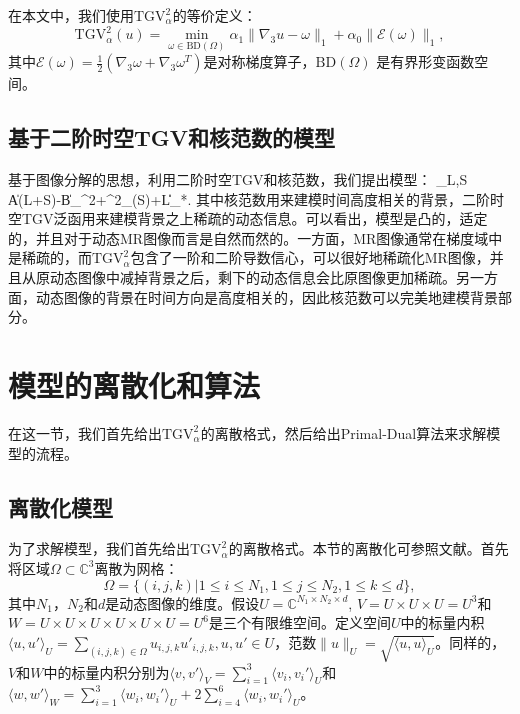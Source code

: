 在本文中，我们使用$\mathrm{TGV}_{\alpha}^2$的等价定义：
$$\mathrm{TGV}_\alpha^2(u)=\min_{\omega\in \mathrm{BD}(\Omega)}\alpha_1\|\nabla_3 u-\omega\|_1 + \alpha_0\|\mathcal{E}(\omega)\|_1,$$
其中$\mathcal{E}(\omega)=\frac{1}{2}(\nabla_3\omega+\nabla_3\omega^{T})$是对称梯度算子，$\mathrm{BD}(\Omega)$ 是有界形变函数空间。

\subsection{基于二阶时空TGV和核范数的模型}
基于图像分解的思想，利用二阶时空TGV和核范数，我们提出模型：
\beq
\min_{L,S} \|A(L+S)-B\|_{}^2+^2_\alpha(S)+\beta\|L\|_*.
\label{equ:proposed}
\eeq
其中核范数用来建模时间高度相关的背景，二阶时空TGV泛函用来建模背景之上稀疏的动态信息。可以看出，模型是凸的，适定的，并且对于动态MR图像而言是自然而然的。一方面，MR图像通常在梯度域中是稀疏的，而$\mathrm{TGV}_{\alpha}^2$包含了一阶和二阶导数信心，可以很好地稀疏化MR图像，并且从原动态图像中减掉背景之后，剩下的动态信息会比原图像更加稀疏。另一方面，动态图像的背景在时间方向是高度相关的，因此核范数可以完美地建模背景部分。

\section{模型的离散化和算法}
在这一节，我们首先给出$\mathrm{TGV}_{\alpha}^2$的离散格式，然后给出Primal-Dual算法来求解模型的流程。

\subsection{离散化模型}
为了求解模型，我们首先给出$\mathrm{TGV}_{\alpha}^2$的离散格式。本节的离散化可参照文献\cite{tgv,pd}。首先将区域$\Omega\subset\mathbb{C}^3$离散为网格：
$$\Omega=\{(i,j,k)\big|1\leq i\leq N_1, 1\leq j\leq N_2, 1\leq k\leq d\},$$
其中$N_1$，$N_2$和$d$是动态图像的维度。假设$U=\mathbb{C}^{N_1\times N_2\times d}$, $V=U\times U\times U=U^3$和$W=U\times U\times U\times U\times U\times U=U^6$是三个有限维空间。定义空间$U$中的标量内积$\langle u,u' \rangle _U=\sum_{(i,j,k)\in \Omega}u_{i,j,k}u'_{i,j,k}, u,u'\in U$，范数$\|u\|_U=\sqrt{\langle u,u \rangle _U}$。同样的，$V$和$W$中的标量内积分别为$\langle v,v'\rangle_V=\sum_{i=1}^3\langle v_i,v_i'\rangle_U$和$\langle w,w'\rangle_W=\sum_{i=1}^3\langle w_i,w_i'\rangle_U + 2\sum_{i=4}^6\langle w_i,w_i'\rangle_U$。


